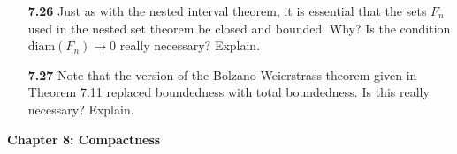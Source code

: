 \documentclass[12pt]{amsart}
\def\diam{\mathrm{diam}}
\begin{document}
\begin{enumerate}
\bigskip

\item[\bf 7.26] Just as with the nested interval theorem, it is essential that the sets $F_n$ used in the nested set theorem be closed and bounded. Why? Is the condition $\diam(F_n)\to 0$ really necessary? Explain. 

\bigskip

\item[\bf 7.27] Note that the version of the Bolzano-Weierstrass theorem given in Theorem 7.11 replaced boundedness with total boundedness. Is this really necessary? Explain.

\bigskip

\end{enumerate}

{\bf Chapter 8: Compactness}
\end{document}
